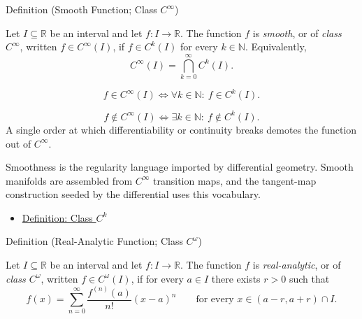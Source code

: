 \begin{definitionbox}{Definition (Smooth Function; Class \(C^\infty\))}
\begin{definition}
\label{def:class-cinfty}
Let \(I\subseteq\mathbb{R}\) be an interval and let \(f:I\to\mathbb{R}\). The function \(f\) is \emph{smooth}, or of \emph{class \(C^\infty\)}, written \(f\in C^\infty(I)\), if \(f\in C^k(I)\) for every \(k\in\mathbb{N}\). Equivalently,
\[
  C^\infty(I)=\bigcap_{k=0}^{\infty}C^k(I).
\]
\end{definition}
\end{definitionbox}

\begin{remark*}
\[
  f\in C^\infty(I)
  \Longleftrightarrow
  \forall k\in\mathbb{N}:\ f\in C^k(I).
\]
\end{remark*}

\begin{remark*}
\[
  f\notin C^\infty(I)
  \Longleftrightarrow
  \exists k\in\mathbb{N}:\ f\notin C^k(I).
\]
A single order at which differentiability or continuity breaks demotes the
function out of \(C^\infty\).
\end{remark*}

\begin{remark*}[Interpretation]
Smoothness is the regularity language imported by differential geometry. Smooth manifolds are assembled from \(C^\infty\) transition maps, and the tangent-map construction seeded by the differential uses this vocabulary.
\end{remark*}

\begin{dependencies}
\begin{itemize}
  \item \hyperref[def:class-ck]{Definition: Class \(C^k\)}
\end{itemize}
\end{dependencies}

\begin{definitionbox}{Definition (Real-Analytic Function; Class \(C^\omega\))}
\begin{definition}
\label{def:class-comega}
Let \(I\subseteq\mathbb{R}\) be an interval and let \(f:I\to\mathbb{R}\). The function \(f\) is \emph{real-analytic}, or of \emph{class \(C^\omega\)}, written \(f\in C^\omega(I)\), if for every \(a\in I\) there exists \(r>0\) such that
\[
  f(x)=\sum_{n=0}^{\infty}\frac{f^{(n)}(a)}{n!}(x-a)^n
  \qquad\text{for every }x\in(a-r,a+r)\cap I.
\]
\end{definition}
\end{definitionbox}

